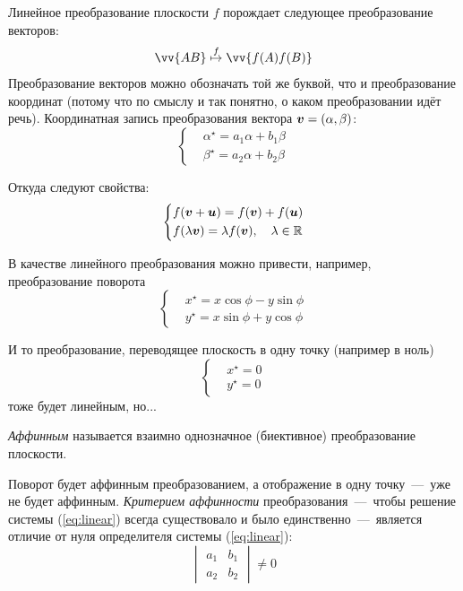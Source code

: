 \documentclass[a4paper,12pt]{article}
\begin{document}
  Линейное преобразование плоскости $f$ порождает следующее преобразование векторов:
  \[
    \vv{AB} \overset{f}{\mapsto} \vv{f(A)f(B)}
  \]
  Преобразование векторов можно обозначать той же буквой, что и преобразование координат (потому что по смыслу и так понятно, о каком преобразовании идёт речь).
  Координатная запись преобразования вектора $\bds v \hm= (\alpha, \beta)$:
  \begin{equation}
    \left\{
      \begin{aligned}
          &\alpha^\star = a_1 \alpha + b_1 \beta\\
          &\beta^\star = a_2 \alpha + b_2 \beta
      \end{aligned}
    \right.
  \end{equation}
  
  Откуда следуют свойства:
  \[
    \left\{
      \begin{aligned}
        &f(\boldsymbol v + \boldsymbol u) = f(\boldsymbol v) + f(\boldsymbol u)\\
        &f(\lambda \boldsymbol v) = \lambda f(\boldsymbol v),\quad \lambda \in \operatorname{\mathbb R}
      \end{aligned}
    \right.
  \]
  
  В качестве линейного преобразования можно привести, например, преобразование поворота
  \[
    \left\{
      \begin{aligned}
        &x^\star = x\cos\phi - y\sin\phi\\
        &y^\star = x\sin\phi + y\cos\phi
      \end{aligned}
    \right.
  \]
  
  И то преобразование, переводящее плоскость в одну точку (например в ноль)
  \[
    \left\{
      \begin{aligned}
        &x^\star = 0\\
        &y^\star = 0
      \end{aligned}
    \right.
  \]
  тоже будет линейным, но...
  
  \begin{definition}
    \emph{Аффинным} называется взаимно однозначное (биективное) преобразование плоскости.
  \end{definition}
  
  
  Поворот будет аффинным преобразованием, а отображение в одну точку~---~уже не будет аффинным.
  \emph{Критерием аффинности} преобразования~---~чтобы решение системы (\ref{eq:linear}) всегда существовало и было единственно~---~является отличие от нуля определителя системы (\ref{eq:linear}):
  \[
    \begin{vmatrix} a_1 & b_1\\ a_2 & b_2\end{vmatrix} \not= 0
  \]
    
\end{document}
